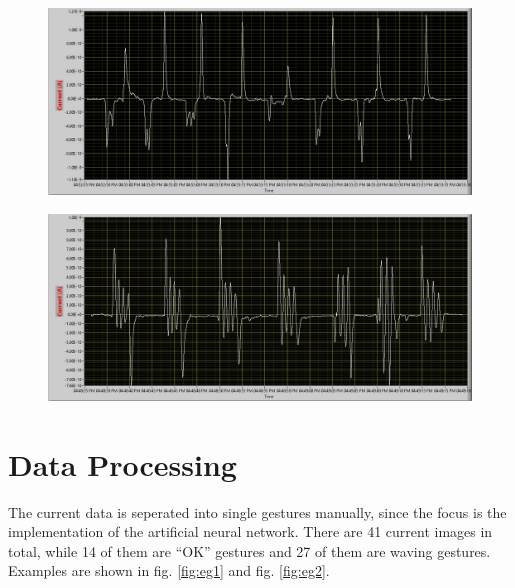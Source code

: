 \documentclass[format=acmsmall,review=false, screen=true, authorversion=true]{acmart}
\begin{document}
\begin{figure}[h]
\centering
\begin{minipage}{.49\textwidth}
  \centering
  \includegraphics[width=.95\linewidth]{pok1}
  \label{fig:ok1}
\end{minipage}
\begin{minipage}{.49\textwidth}
  \centering
  \includegraphics[width=.95\linewidth]{pwave1}
  \label{fig:wave1}
\end{minipage}
\end{figure}


\section{Data Processing}
The current data is seperated into single gestures manually, since the focus is the implementation of the artificial neural network. There are 41 current images in total, while 14 of them are ``OK'' gestures and 27 of them are waving gestures. Examples are shown in fig. \ref{fig:eg1} and fig. \ref{fig:eg2}.
\end{document}
